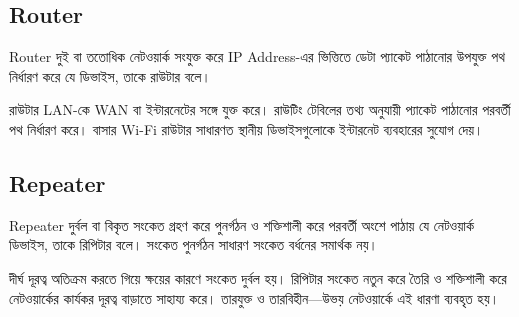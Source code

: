 \subsection{Router}

\begin{definitionbox}{Router}
দুই বা ততোধিক নেটওয়ার্ক সংযুক্ত করে IP Address-এর ভিত্তিতে ডেটা প্যাকেট পাঠানোর উপযুক্ত পথ নির্ধারণ করে যে ডিভাইস, তাকে রাউটার বলে।
\end{definitionbox}

রাউটার LAN-কে WAN বা ইন্টারনেটের সঙ্গে যুক্ত করে। রাউটিং টেবিলের তথ্য অনুযায়ী প্যাকেট পাঠানোর পরবর্তী পথ নির্ধারণ করে। বাসার Wi-Fi রাউটার সাধারণত স্থানীয় ডিভাইসগুলোকে ইন্টারনেট ব্যবহারের সুযোগ দেয়।



\subsection{Repeater}

\begin{definitionbox}{Repeater}
দুর্বল বা বিকৃত সংকেত গ্রহণ করে পুনর্গঠন ও শক্তিশালী করে পরবর্তী অংশে পাঠায় যে নেটওয়ার্ক ডিভাইস, তাকে রিপিটার বলে। সংকেত পুনর্গঠন সাধারণ সংকেত বর্ধনের সমার্থক নয়।
\end{definitionbox}

দীর্ঘ দূরত্ব অতিক্রম করতে গিয়ে ক্ষয়ের কারণে সংকেত দুর্বল হয়। রিপিটার সংকেত নতুন করে তৈরি ও শক্তিশালী করে নেটওয়ার্কের কার্যকর দূরত্ব বাড়াতে সাহায্য করে। তারযুক্ত ও তারবিহীন—উভয় নেটওয়ার্কে এই ধারণা ব্যবহৃত হয়।

